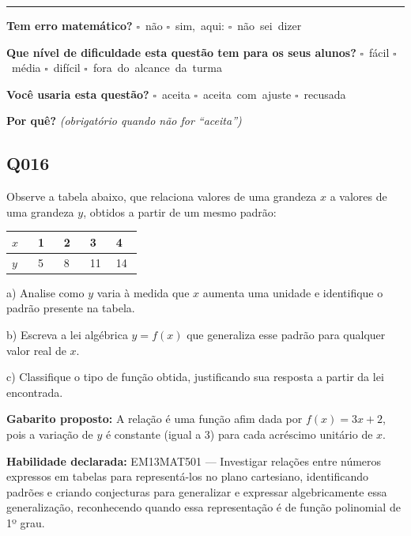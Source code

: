 \documentclass[11pt,a4paper]{article}
\begin{document}
\noindent\rule{\linewidth}{0.4pt}
\textbf{Tem erro matemático?}\quad
\mbox{$\square$~não} \quad \mbox{$\square$~sim, aqui:} \underline{\hspace{5cm}}
\quad \mbox{$\square$~não sei dizer}

\textbf{Que nível de dificuldade esta questão tem para os seus alunos?}\quad
\mbox{$\square$~fácil} \quad \mbox{$\square$~média} \quad
\mbox{$\square$~difícil} \quad \mbox{$\square$~fora do alcance da turma}

\textbf{Você usaria esta questão?}\quad
\mbox{$\square$~aceita} \quad \mbox{$\square$~aceita com ajuste} \quad
\mbox{$\square$~recusada}

\textbf{Por quê?} \emph{(obrigatório quando não for ``aceita'')}

\underline{\hspace{\linewidth}}

\underline{\hspace{\linewidth}}
\vspace{0.6em}

\begin{samepage}
\subsection*{Q016}
Observe a tabela abaixo, que relaciona valores de uma grandeza $x$ a valores de uma grandeza $y$, obtidos a partir de um mesmo padrão:

\begin{center}
\begin{tabular}{|p{0.172\linewidth}|p{0.172\linewidth}|p{0.172\linewidth}|p{0.172\linewidth}|p{0.172\linewidth}|}
\hline
\textbf{$x$} & \textbf{1} & \textbf{2} & \textbf{3} & \textbf{4} \\
\hline
$y$ & 5 & 8 & 11 & 14 \\
\hline
\end{tabular}
\end{center}

a) Analise como $y$ varia à medida que $x$ aumenta uma unidade e identifique o padrão presente na tabela.

b) Escreva a lei algébrica $y = f(x)$ que generaliza esse padrão para qualquer valor real de $x$.

c) Classifique o tipo de função obtida, justificando sua resposta a partir da lei encontrada.

\textbf{Gabarito proposto:} A relação é uma função afim dada por $f(x) = 3x + 2$, pois a variação de $y$ é constante (igual a 3) para cada acréscimo unitário de $x$.

\textbf{Habilidade declarada:} EM13MAT501 --- Investigar relações entre números expressos em tabelas para representá-los no plano cartesiano, identificando padrões e criando conjecturas para generalizar e expressar algebricamente essa generalização, reconhecendo quando essa representação é de função polinomial de 1º grau.
\end{samepage}
\end{document}
